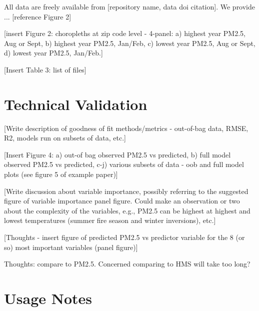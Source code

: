 \documentclass[english]{article}
\begin{document}

All data are freely available from [repository name, data doi citation]. We provide ... [reference Figure 2]

[insert Figure 2: choropleths at zip code level - 4-panel: a) highest year PM2.5, Aug or Sept, b) highest year PM2.5, Jan/Feb, c) lowest year PM2.5, Aug or Sept, d) lowest year PM2.5, Jan/Feb.]

[Insert Table 3: list of files]

\section*{Technical Validation}


[Write description of goodness of fit methods/metrics - out-of-bag data, RMSE, R2, models run on subsets of data, etc.]

[Insert Figure 4: a) out-of bag observed PM2.5 vs predicted, b) full model observed PM2.5 vs predicted, c-j) various subsets of data - oob and full model plots (see figure 5 of example paper)]

[Write discussion about variable importance, possibly referring to the suggested figure of variable importance panel figure. Could make an observation or two about the complexity of the variables, e.g., PM2.5 can be highest at highest and lowest temperatures (summer fire season and winter inversions), etc.]

[Thoughts - insert figure of predicted PM2.5 vs predictor variable for the 8 (or so) most important variables (panel figure)]

Thoughts: compare to PM2.5. Concerned comparing to HMS will take too long? 


\section*{Usage Notes}
\end{document}
